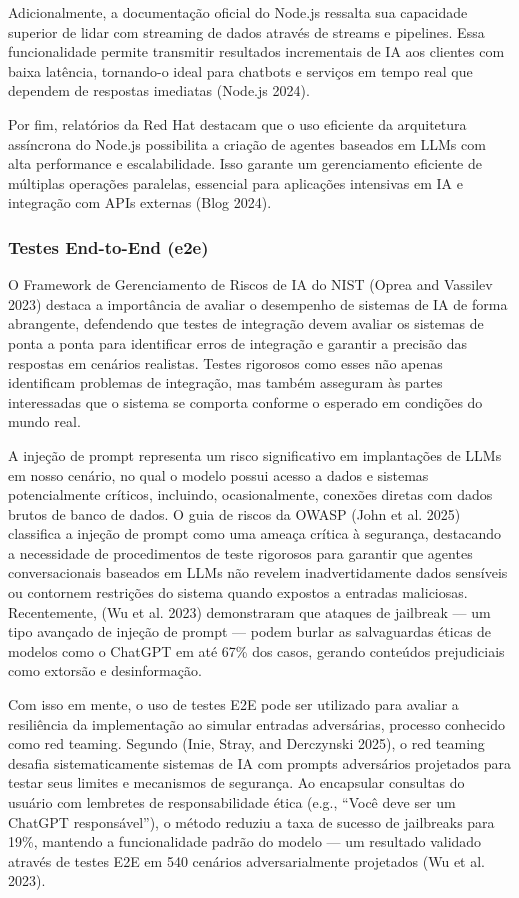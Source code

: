\documentclass[
]{article}
\begin{document}
Adicionalmente, a documentação oficial do Node.js ressalta sua
capacidade superior de lidar com streaming de dados através de streams e
pipelines. Essa funcionalidade permite transmitir resultados
incrementais de IA aos clientes com baixa latência, tornando-o ideal
para chatbots e serviços em tempo real que dependem de respostas
imediatas (Node.js 2024).

Por fim, relatórios da Red Hat destacam que o uso eficiente da
arquitetura assíncrona do Node.js possibilita a criação de agentes
baseados em LLMs com alta performance e escalabilidade. Isso garante um
gerenciamento eficiente de múltiplas operações paralelas, essencial para
aplicações intensivas em IA e integração com APIs externas (Blog 2024).

\subsubsection{Testes End-to-End (e2e)}\label{testes-end-to-end-e2e}

O Framework de Gerenciamento de Riscos de IA do NIST (Oprea and Vassilev
2023) destaca a importância de avaliar o desempenho de sistemas de IA de
forma abrangente, defendendo que testes de integração devem avaliar os
sistemas de ponta a ponta para identificar erros de integração e
garantir a precisão das respostas em cenários realistas. Testes
rigorosos como esses não apenas identificam problemas de integração, mas
também asseguram às partes interessadas que o sistema se comporta
conforme o esperado em condições do mundo real.

A injeção de prompt representa um risco significativo em implantações de
LLMs em nosso cenário, no qual o modelo possui acesso a dados e sistemas
potencialmente críticos, incluindo, ocasionalmente, conexões diretas com
dados brutos de banco de dados. O guia de riscos da OWASP (John et al.
2025) classifica a injeção de prompt como uma ameaça crítica à
segurança, destacando a necessidade de procedimentos de teste rigorosos
para garantir que agentes conversacionais baseados em LLMs não revelem
inadvertidamente dados sensíveis ou contornem restrições do sistema
quando expostos a entradas maliciosas. Recentemente, (Wu et al. 2023)
demonstraram que ataques de jailbreak --- um tipo avançado de injeção de
prompt --- podem burlar as salvaguardas éticas de modelos como o ChatGPT
em até 67\% dos casos, gerando conteúdos prejudiciais como extorsão e
desinformação.

Com isso em mente, o uso de testes E2E pode ser utilizado para avaliar a
resiliência da implementação ao simular entradas adversárias, processo
conhecido como red teaming. Segundo (Inie, Stray, and Derczynski 2025),
o red teaming desafia sistematicamente sistemas de IA com prompts
adversários projetados para testar seus limites e mecanismos de
segurança. Ao encapsular consultas do usuário com lembretes de
responsabilidade ética (e.g., ``Você deve ser um ChatGPT responsável''),
o método reduziu a taxa de sucesso de jailbreaks para 19\%, mantendo a
funcionalidade padrão do modelo --- um resultado validado através de
testes E2E em 540 cenários adversarialmente projetados (Wu et al. 2023).
\end{document}
